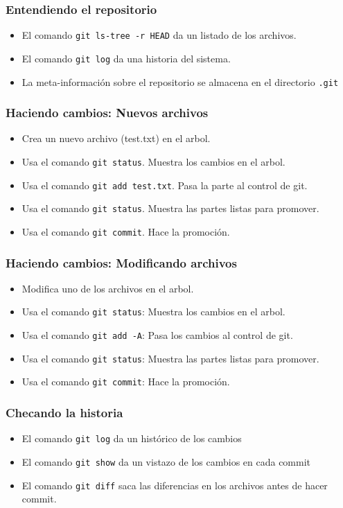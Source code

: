 \begin{frame}
	\frametitle{Entendiendo el repositorio}
	\begin{itemize}
		\item El comando \texttt{git ls-tree -r HEAD} da un listado de los archivos.
		\item El comando \texttt{git log} da una historia del sistema. 
		\item La meta-informaci\'on sobre el repositorio se almacena en el directorio \texttt{.git}
	\end{itemize}
\end{frame}
\begin{frame}
	\frametitle{Haciendo cambios: Nuevos archivos}
	\begin{itemize}
		\item Crea un nuevo archivo (test.txt) en el arbol. 
		\item Usa el comando \texttt{git status}. Muestra los cambios en el arbol. 
		\item Usa el comando \texttt{git add test.txt}. Pasa la parte al control de git. 
		\item Usa el comando \texttt{git status}. Muestra las partes listas para promover. 
		\item Usa el comando \texttt{git commit}. Hace la promoci\'on. 
	\end{itemize}
\end{frame}
\begin{frame}
	\frametitle{Haciendo cambios: Modificando archivos}
	\begin{itemize}
		\item Modifica uno de los archivos en el arbol. 
		\item Usa el comando \texttt{git status}: Muestra los cambios en el arbol.
		\item Usa el comando \texttt{git add -A}: Pasa los cambios al control de git. 
		\item Usa el comando \texttt{git status}: Muestra las partes listas para promover.
		\item Usa el comando \texttt{git commit}: Hace la promoci\'on.
	\end{itemize}
\end{frame}
\begin{frame}
	\frametitle{Checando la historia}
	\begin{itemize}
		\item El comando \texttt{git log} da un hist\'orico de los cambios
		\item El comando \texttt{git show} da un vistazo de los cambios en cada commit
		\item El comando \texttt{git diff} saca las diferencias en los archivos antes de hacer commit. 
	\end{itemize}
\end{frame}

